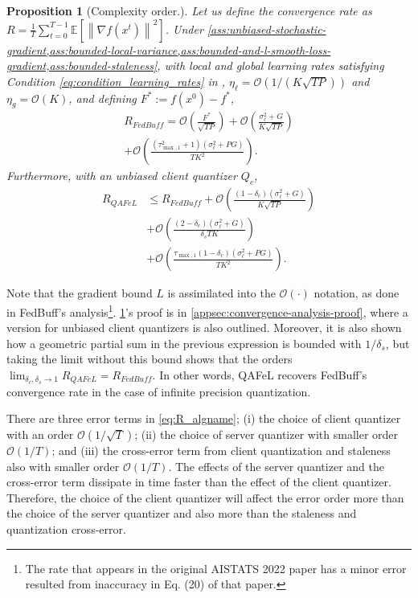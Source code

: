 \documentclass[nohyperref]{article}
\theoremstyle{plain}
\newtheorem{proposition}[theorem]{Proposition}
\theoremstyle{definition}
\theoremstyle{remark}
\newcommand{\algname}{{QAFeL}\xspace} %
\newcommand{\norm}[1]{\left\lVert#1\right\rVert}
\newcommand{\expec}[1]{\mathbb{E}\left[#1\right]}
\newcommand{\order}[1]{\mathcal{O}\left(#1\right)}
\begin{document}
\begin{proposition}[Complexity order.] \label{prop:complexity_order}
    Let us define the convergence rate as $R = \frac{1}{T} \sum_{t=0}^{T-1} \expec{\norm{\nabla f(x^t)}^2}$.
    Under \cref{ass:unbiased-stochastic-gradient,ass:bounded-local-variance,ass:bounded-and-l-smooth-loss-gradient,ass:bounded-staleness}, with local and global learning rates satisfying Condition \eqref{eq:condition_learning_rates} in , $\eta_\ell = \order{1 / (K\sqrt{TP})}$ and $\eta_g = \order{K}$, and defining $F^* := f(x^0) - f^*$,
    \begin{multline}
        R_{FedBuff} = \order{\frac{F^*}{\sqrt{TP}}}  + \order{ \frac{\sigma_{\ell}^2 + G}{K\sqrt{TP}} } \\
        + \order{\frac{ (\tau_{\max, 1}^2 + 1) (\sigma_{\ell}^2 + PG)}{TK^2}}.
    \end{multline}
    Furthermore, with an unbiased client quantizer $Q_c$,
    \begin{equation} \label{eq:R_algname}
        \begin{aligned}
            R_{\algname} & \leq R_{FedBuff} + \order{ \frac{(1-\delta_c)(\sigma_{\ell}^2 + G)}{K\sqrt{TP}} } \\
                         & + \order{\frac{(2-\delta_c)(\sigma_\ell^2 + G)}{\delta_s TK} }                    \\
                         & + \order{\frac{ \tau_{\max, 1}(1-\delta_c) (\sigma_{\ell}^2 + PG)}{TK^2} }.
        \end{aligned}
    \end{equation}
\end{proposition}
Note that the gradient bound $L$ is assimilated into the $\order{\cdot}$ notation, as done in FedBuff's analysis\footnote{The rate that appears in the original AISTATS 2022 paper has a minor error resulted from inaccuracy in Eq. (20) of that paper.}.
\cref{prop:complexity_order}'s proof is in \cref{appsec:convergence-analysis-proof}, where a version for unbiased client quantizers is also outlined.
Moreover, it is also shown how a geometric partial sum in the previous expression is bounded with $1/\delta_s$, but taking the limit without this bound shows that the orders $ \lim_{\delta_c, \delta_s \to 1} R_{\algname} = R_{FedBuff}$.
In other words, \algname recovers FedBuff's convergence rate in the case of infinite precision quantization.

There are three error terms in  \eqref{eq:R_algname}; (i)
the choice of client quantizer with an order $\order{1/\sqrt{T}}$; (ii) the choice of server quantizer with smaller order $\order{1/T}$; and (iii) the cross-error term from client quantization and staleness also with smaller order $\order{1/T}$.
The effects of the server quantizer and the cross-error term dissipate in time faster than the effect of the client quantizer.
Therefore, the choice of the client quantizer will affect the error order more than the choice of the server quantizer and also more than the staleness and quantization cross-error.
\end{document}
